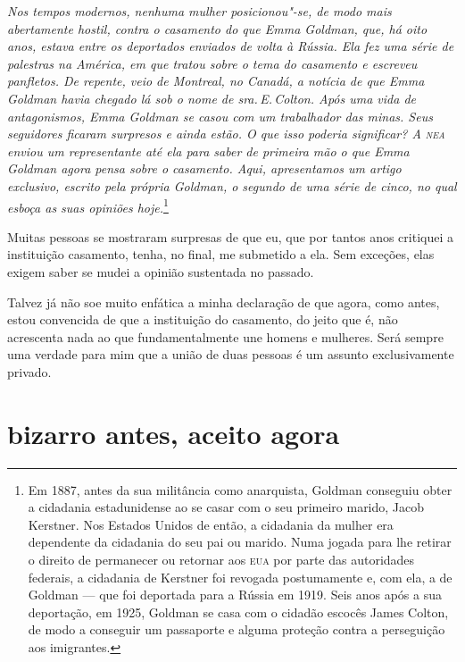 \textit{Nos tempos modernos, nenhuma mulher posicionou"-se, de
modo mais abertamente hostil, contra o casamento do que Emma Goldman,
que, há oito anos, estava entre os deportados enviados de volta à
Rússia. Ela fez uma série de palestras na América, em que tratou sobre o
tema do casamento e escreveu panfletos. De repente, veio de Montreal, no Canadá, a notícia de que Emma Goldman havia chegado lá sob o nome de
sra.\,E.\,Colton. Após uma vida de antagonismos, Emma Goldman se casou com
um trabalhador das minas. Seus seguidores ficaram surpresos e ainda
estão. O que isso poderia significar? A \textit{\textsc{nea}} enviou um representante até
ela para saber de primeira mão o que Emma Goldman agora pensa sobre o
casamento. Aqui, apresentamos um artigo exclusivo, escrito pela própria
Goldman, o segundo de uma série de cinco, no qual esboça as suas opiniões
hoje.}\footnote{Em 1887, antes da sua militância como anarquista, Goldman
  conseguiu obter a cidadania estadunidense ao se casar com o seu
  primeiro marido, Jacob Kerstner. Nos Estados Unidos de então, a
  cidadania da mulher era dependente da cidadania do seu pai ou marido.
  Numa jogada para lhe retirar o direito de permanecer ou retornar aos \textsc{eua}
  por parte das autoridades federais, a cidadania de Kerstner foi revogada
  postumamente e, com ela, a de Goldman --- que foi deportada para a
  Rússia em 1919. Seis anos após a sua deportação, em 1925, Goldman se
  casa com o cidadão escocês James Colton, de modo a conseguir um
  passaporte e alguma proteção contra a perseguição aos imigrantes.}

\begin{center}
\end{center}

Muitas pessoas se mostraram surpresas de que eu, que por tantos anos
critiquei a instituição casamento, tenha, no final, me submetido a ela. Sem exceções, elas exigem saber se mudei a opinião sustentada no
passado.

Talvez já não soe muito enfática a minha declaração de que agora, como
antes, estou convencida de que a instituição do casamento, do jeito que
é, não acrescenta nada ao que fundamentalmente une homens e mulheres.
Será sempre uma verdade para mim que a união de duas pessoas é um
assunto exclusivamente privado.

\section{bizarro antes, aceito agora}

